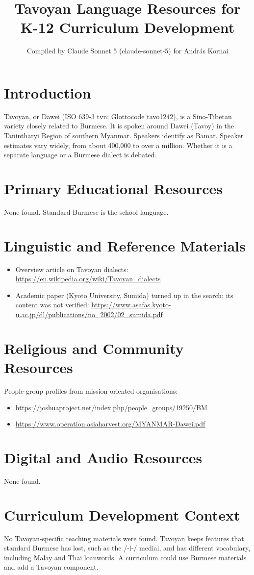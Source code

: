 \documentclass[12pt]{article}
\title{Tavoyan Language Resources for K-12 Curriculum Development}
\author{Compiled by Claude Sonnet 5 (claude-sonnet-5) for Andr\'as Kornai}
\date{}
\begin{document}
\maketitle

\section{Introduction}
Tavoyan, or Dawei (ISO 639-3 tvn; Glottocode tavo1242), is a Sino-Tibetan variety closely related to Burmese. It is spoken around Dawei (Tavoy) in the Tanintharyi Region of southern Myanmar. Speakers identify as Bamar. Speaker estimates vary widely, from about 400,000 to over a million. Whether it is a separate language or a Burmese dialect is debated.

\section{Primary Educational Resources}
None found. Standard Burmese is the school language.

\section{Linguistic and Reference Materials}
\begin{itemize}
\item Overview article on Tavoyan dialects: \url{https://en.wikipedia.org/wiki/Tavoyan_dialects}
\item Academic paper (Kyoto University, Sumida) turned up in the search; its content was not verified: \url{https://www.asafas.kyoto-u.ac.jp/dl/publications/no_2002/02_sumida.pdf}
\end{itemize}

\section{Religious and Community Resources}
People-group profiles from mission-oriented organisations:
\begin{itemize}
\item \url{https://joshuaproject.net/index.php/people_groups/19250/BM}
\item \url{https://www.operation.asiaharvest.org/MYANMAR-Dawei.pdf}
\end{itemize}

\section{Digital and Audio Resources}
None found.

\section{Curriculum Development Context}
No Tavoyan-specific teaching materials were found. Tavoyan keeps features that standard Burmese has lost, such as the /-l-/ medial, and has different vocabulary, including Malay and Thai loanwords. A curriculum could use Burmese materials and add a Tavoyan component.
\end{document}
